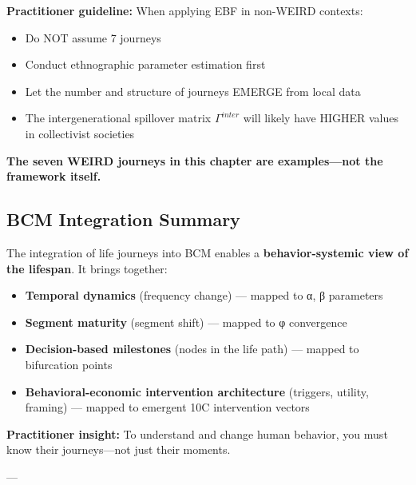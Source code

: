 {{{\begin{tcolorbox}[colback=orange!5!white, colframe=orange!75!black, title=Methodological Note: Cultural Adaptation]
\textbf{Practitioner guideline:} When applying EBF in non-WEIRD contexts:
\begin{itemize}[nosep]
\item Do NOT assume 7 journeys
\item Conduct ethnographic parameter estimation first
\item Let the number and structure of journeys EMERGE from local data
\item The intergenerational spillover matrix $\Gamma^{inter}$ will likely have HIGHER values in collectivist societies
\end{itemize}

\textbf{The seven WEIRD journeys in this chapter are examples---not the framework itself.}

\end{tcolorbox}

\subsection{BCM Integration Summary}

\begin{tcolorbox}[colback=blue!5!white, colframe=blue!75!black, title=Key Takeaway: Life Journeys as BCM Core Element]

The integration of life journeys into BCM enables a \textbf{behavior-systemic view of the lifespan}. It brings together:

\begin{itemize}[nosep]
\item \textbf{Temporal dynamics} (frequency change) --- mapped to α, β parameters
\item \textbf{Segment maturity} (segment shift) --- mapped to φ convergence
\item \textbf{Decision-based milestones} (nodes in the life path) --- mapped to bifurcation points
\item \textbf{Behavioral-economic intervention architecture} (triggers, utility, framing) --- mapped to emergent 10C intervention vectors
\end{itemize}

\textbf{Practitioner insight:} To understand and change human behavior, you must know their journeys---not just their moments.

\end{tcolorbox}

---


}}}
